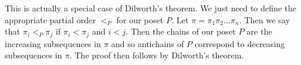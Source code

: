 \documentclass[12pt,twoside]{article}
\begin{document}
\begin{problem}{20}
{This is actually a special case of Dilworth's theorem.  We just need to define the appropriate partial order $<_P$ for our poset $P$.  Let $\pi = \pi_1 \pi_2 \ldots \pi_n$.  Then we say that $\pi_i <_P \pi_j$ if $\pi_i < \pi_j$ and $i < j$.  Then the chains of our poset $P$ are the increasing subsequences in $\pi$ and so antichains of $P$ correspond to decreasing subsequences in $\pi$.  The proof then follows by Dilworth's theorem.  
}

\eparts

\end{problem}



\end{document}
